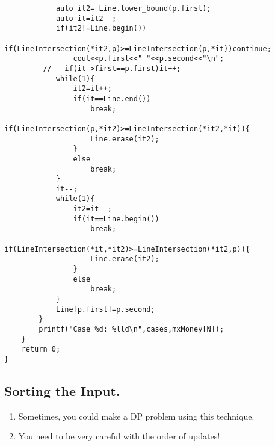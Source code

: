 \documentclass[12pt]{book}
\begin{document}
\begin{verbatim}
            auto it2= Line.lower_bound(p.first);
            auto it=it2--;
            if(it2!=Line.begin())
            if(LineIntersection(*it2,p)>=LineIntersection(p,*it))continue;
                cout<<p.first<<" "<<p.second<<"\n";
         //   if(it->first==p.first)it++;
            while(1){
                it2=it++;
                if(it==Line.end())
                    break;
                if(LineIntersection(p,*it2)>=LineIntersection(*it2,*it)){
                    Line.erase(it2);
                }
                else
                    break;
            }
            it--;
            while(1){
                it2=it--;
                if(it==Line.begin())
                    break;
                if(LineIntersection(*it,*it2)>=LineIntersection(*it2,p)){
                    Line.erase(it2);
                }
                else
                    break;
            }
            Line[p.first]=p.second;
        }
        printf("Case %d: %lld\n",cases,mxMoney[N]);
    }
    return 0;
}
\end{verbatim}
\subsection{Sorting the Input.}
\begin{enumerate}[label = \roman*.]
\item Sometimes, you could make a DP problem using this technique.
\item You need to be very careful with the order of updates!
\end{enumerate}
\end{document}

